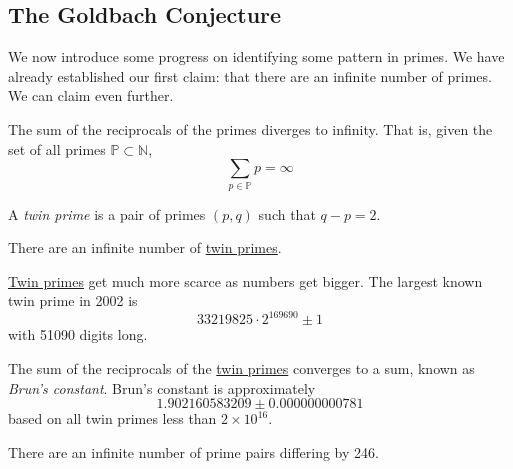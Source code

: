\documentclass{article}
\newcounter{theorem}[section]
\newcounter{definition}[section]
\begin{document}
\subsection{The Goldbach Conjecture}
We now introduce some progress on identifying some pattern in primes. We have already established our first claim: that there are an infinite number of primes. We can claim even further. 

\begin{theorem}
  \label{thm:divergence-of-the-sum-of-prime-reciprocals}
The sum of the reciprocals of the primes diverges to infinity. That is, given the set of all primes $\mathbb{P} \subset \mathbb{N}$,
\begin{equation}
  \sum_{p \in \mathbb{P}} p = \infty
\end{equation}
\end{theorem}

\begin{definition}
  \label{def:twin-prime}
A \textit{twin prime} is a pair of primes $(p, q)$ such that $q-p = 2$. 
\end{definition}

\begin{theorem}
  \label{thm:twin-prime-conjecture}
There are an infinite number of \hyperref[def:twin-prime]{twin primes}. 
\end{theorem}

\hyperref[def:twin-prime]{Twin primes} get much more scarce as numbers get bigger. The largest known twin prime in 2002 is 
\begin{equation}
  33219825 \cdot 2^{169690} \pm 1
\end{equation}
with 51090 digits long. 

\begin{theorem}[Brun]
  \label{thm:brun}
The sum of the reciprocals of the \hyperref[def:twin-prime]{twin primes} converges to a sum, known as \textit{Brun's constant}. Brun's constant is approximately
\begin{equation}
  1.902160583209\pm 0.000000000781
\end{equation}
based on all twin primes less than $2 \times 10^{16}$.
\end{theorem}

\begin{theorem}[Zhang, 2014]
  \label{thm:zhang-2014}
There are an infinite number of prime pairs differing by 246. 
\end{theorem}
\end{document}
